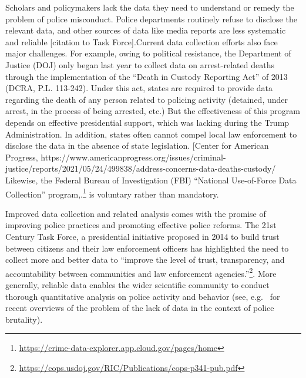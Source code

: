 Scholars and policymakers lack the data they need to understand or remedy the
problem of police misconduct. Police departments routinely refuse to disclose
the relevant data, and other sources of data like media reports are less
systematic and reliable [citation to Task Force].Current data collection
efforts also face major challenges. For example, owing to political resistance,
the Department of Justice (DOJ) only began last year to collect data on
arrest-related deaths through the implementation of the ``Death in Custody
Reporting Act'' of 2013 (DCRA, P.L. 113-242). Under this act, states are
required to provide data regarding the death of any person related to policing
activity (detained, under arrest, in the process of being arrested, etc.) But
the effectiveness of this program depends on effective presidential support,
which was lacking during the Trump Administration. In addition, states often
cannot compel local law enforcement to disclose the data in the absence of
state legislation. [Center for American Progress,
https://www.americanprogress.org/issues/criminal-justice/reports/2021/05/24/499838/address-concerns-data-deaths-custody/
Likewise, the Federal Bureau of Investigation (FBI) ``National Use-of-Force
Data Collection''
program,.\footnote{\url{https://crime-data-explorer.app.cloud.gov/pages/home}}
is voluntary rather than mandatory. 

Improved data collection and related analysis comes with the promise of
improving  police practices and promoting effective police reforms. The 21st
Century Task Force, a presidential initiative proposed in 2014 to build trust
between citizens and their law enforcement officers has highlighted the need to
collect more and better data to ``improve the level of trust, transparency, and
accountability between communities and law enforcement
agencies.''\footnote{\url{https://cops.usdoj.gov/RIC/Publications/cops-p341-pub.pdf}}.
More generally, reliable data enables the wider scientific community to conduct
thorough quantitative analysis on police activity and behavior 
(see, e.g.~\citet{peeples2019data,peeples2020data} for recent overviews of the problem of
the lack of data in the context of police brutality).

